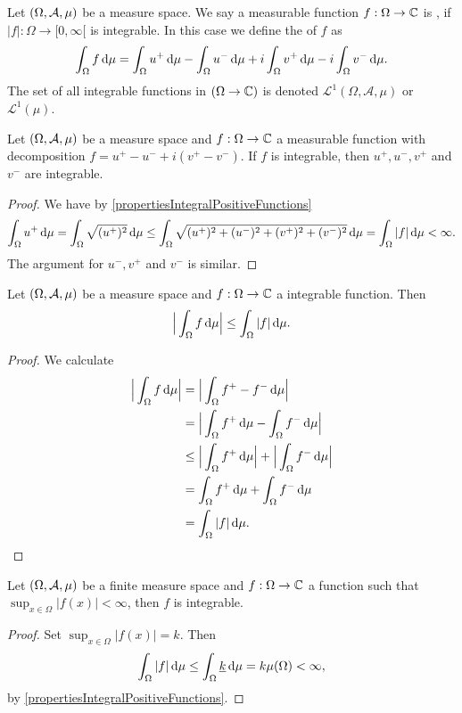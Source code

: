 \begin{definition}
Let $\sSet{\Omega, \mathcal{A},\mu}$ be a measure space. We say a measurable function $f: \Omega \to \mathbb{C}$ is , if $|f|:\Omega\to [0,\infty[$ is integrable. In this case we define the  of $f$ as
\[ \int_\Omega f\operatorname{d \!}{\mu} = \int_\Omega u^+\operatorname{d \!}{\mu} - \int_\Omega u^-\operatorname{d \!}{\mu} + i\int_\Omega v^+\operatorname{d \!}{\mu} - i\int_\Omega v^-\operatorname{d \!}{\mu}. \]
The set of all integrable functions in $(\Omega \to \mathbb{C})$ is denoted $\mathcal{L} ^1(\Omega,\mathcal{A},\mu)$ or $\mathcal{L} ^1(\mu)$.
\end{definition}

\begin{lemma}
Let $\sSet{\Omega, \mathcal{A},\mu}$ be a measure space and $f: \Omega \to \mathbb{C}$ a measurable function with decomposition $f = u^+ - u^- + i(v^+ -v^-)$. If $f$ is integrable, then $u^+, u^-, v^+$ and $v^-$ are integrable.
\end{lemma}
\begin{proof}
We have by \ref{propertiesIntegralPositiveFunctions}
\[ \int_\Omega u^+ \operatorname{d \!}{\mu} = \int_\Omega \sqrt{(u^+)^2} \operatorname{d \!}{\mu} \leq \int_\Omega \sqrt{(u^+)^2+ (u^-)^2 + (v^+)^2 + (v^-)^2} \operatorname{d \!}{\mu} = \int_\Omega|f|\operatorname{d \!}{\mu} < \infty. \]
The argument for $u^-,v^+$ and $v^-$ is similar.
\end{proof}

\begin{lemma} \label{integralTriangleInequality}
Let  $\sSet{\Omega, \mathcal{A},\mu}$ be a measure space and $f: \Omega \to \mathbb{C}$ a integrable function. Then
\[ \Big| \int_\Omega f\operatorname{d \!}{\mu} \Big| \leq \int_\Omega |f|\operatorname{d \!}{\mu}. \]
\end{lemma}
\begin{proof}
We calculate
\begin{align*}
\Big| \int_\Omega f\diff{\mu} \Big| &= \Big| \int_\Omega f^+ - f^- \diff{\mu} \Big| \\
&= \Big| \int_\Omega f^+\diff{\mu} - \int_\Omega f^-\diff{\mu} \Big| \\
&\leq \Big| \int_\Omega f^+\diff{\mu}\Big| + \Big|\int_\Omega f^-\diff{\mu} \Big| \\
&= \int_\Omega f^+\diff{\mu} + \int_\Omega f^-\diff{\mu} \\
&= \int_\Omega |f|\diff{\mu}.
\end{align*}
\end{proof}

\begin{lemma} \label{finiteMeasureBoundedFunctionMeasurable}
Let $\sSet{\Omega, \mathcal{A},\mu}$ be a finite measure space and $f: \Omega \to \mathbb{C}$ a function such that $\sup_{x\in \Omega}|f(x)|<\infty$, then $f$ is integrable.
\end{lemma}
\begin{proof}
Set $\sup_{x\in \Omega}|f(x)| = k$. Then
\[ \int_\Omega |f|\operatorname{d \!}{\mu} \leq \int_\Omega \underline{k}\operatorname{d \!}{\mu} = k\mu(\Omega) < \infty, \]
by \ref{propertiesIntegralPositiveFunctions}.
\end{proof}



